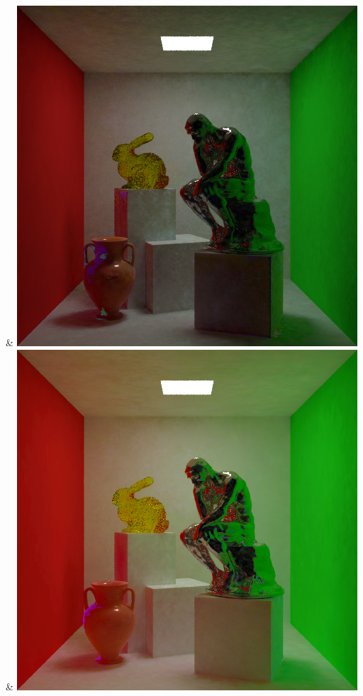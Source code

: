 & \includegraphics[width=\linewidth]{figures/py/tests/quality_comparison/nrc+pt_1spp_thinker.png}
& \includegraphics[width=\linewidth]{figures/py/tests/quality_comparison/nrc+pt+sl_1spp_thinker.png}

